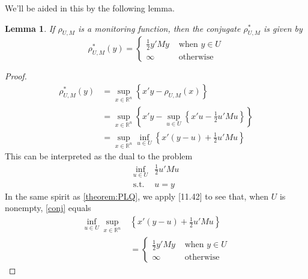 \documentclass[12pt]{article}
\newtheorem{lemma}[theorem]{Lemma}
\theoremstyle{remark}
\theoremstyle{remark}
\begin{document}
We'll be aided in this by the following lemma.
\begin{lemma}
If $\rho_{U,M}$ is a monitoring function, then the conjugate
$\rho^{*}_{U, M}$ is given by
$$\rho^{*}_{U,M}(y) = \left\{ \begin{array}{cc} \frac{1}{2} y' M y &
\text{ when } y \in U \\ \infty & \text{ otherwise} \end{array}
\right.$$
\end{lemma}
\begin{proof}
\begin{align} \label{conj}
\rho^{*}_{U, M}(y) &= \sup_{x \in \mathbb{R}^{n}} \left\{ x' y
 - \rho_{U, M}(x) \right\} \nonumber \\
&= \sup_{x \in \mathbb{R}^{n}} \left\{ x'y - \sup_{u
\in U} \left\{ x'u - \frac{1}{2} u' M u \right\} \right\} \nonumber \\
&= \sup_{x \in \mathbb{R}^{n}} \inf_{u \in U} \left\{ x'(y-u) +
\frac{1}{2} u' M u \right\} 
\end{align}
This can be interpreted as the dual to the problem 
\begin{align*} 
\inf_{u \in U} & \frac{1}{2} u' M u  \\
\text{s.t. }&  u=y 
\end{align*}
In the same spirit as \ref{theorem:PLQ}, we apply \cite{VarAnal}[11.42]
to see that, when $U$ is nonempty, \ref{conj} equals
\begin{align*}
\inf_{u \in U} \sup_{x \in \mathbb{R}^{n}} & \left\{ x'(y-u) + \frac{1}{2} u' M u
\right\} \\
&= \left\{ \begin{array}{cc} \frac{1}{2} y' M y &
\text{ when } y \in U \\ \infty & \text{ otherwise} \end{array}
\right.
\end{align*}
\end{proof}
\end{document}
